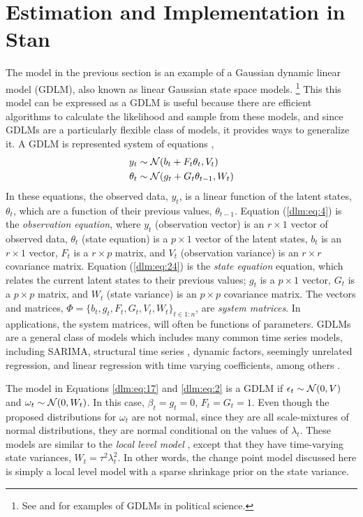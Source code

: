 \documentclass[12pt]{article}
\begin{document}
\section{Estimation and Implementation in Stan}
\label{dlm:sec:estimation}

The model in the previous section is an example of a Gaussian dynamic linear model (GDLM), also known as linear Gaussian state space models.%
\footnote{See \textcite{Beck1989} and \textcite{MartinQuinn2002} for examples of GDLMs in political science.}
This this model can be expressed as a GDLM is useful because there are efficient algorithms to calculate the likelihood and sample from these models, and since GDLMs are a particularly flexible class of models, it provides ways to generalize it.
A GDLM is represented system of equations \parencites{DurbinKoopman2012}{WestHarrison1997}{PetrisPetroneEtAl2009}[Ch 6]{ShumwayStoffer2010},
\begin{align}
  \label{dlm:eq:4}
  y_{t} &\sim \mathcal{N}\mathopen{}\left(b_{t} + F_{t} \theta_{t}, V_{t}\right)\mathclose{} \\
  \label{dlm:eq:24}
  \theta_{t} &\sim \mathcal{N}\mathopen{}\left(g_{t} + G_{t} \theta_{t - 1}, W_{t}\right)\mathclose{}
\end{align}
In these equations, the observed data, $y_{t}$, is a linear function of the latent states, $\theta_{t}$, which are a function of their previous values, $\theta_{t-1}$.
Equation (\ref{dlm:eq:4}) is the \textit{observation equation}, where $y_{t}$ (observation vector) is an $r \times 1$ vector of observed data, $\theta_{t}$ (state equation) is a $p \times 1$ vector of the latent states, $b_{t}$ is an $r \times 1$ vector, $F_{t}$ is a $r \times p$ matrix, and $V_{t}$ (observation variance) is an $r \times r$ covariance matrix.
Equation (\ref{dlm:eq:24}) is the \textit{state equation} equation, which relates the current latent states to their previous values; $g_{t}$ is a $p \times 1$ vector, $G_{t}$ is a $p \times p$ matrix, and $W_{t}$ (state variance) is an $p \times p$ covariance matrix.
The vectors and matrices, $\Phi = \{ b_{t}, g_{t}, F_{t}, G_{t}, V_{t}, W_{t} \}_{t \in 1:n}$, are \textit{system matrices}.
In applications, the system matrices, will often be functions of parameters.
GDLMs are a general class of models which includes many common time series models, including SARIMA, structural time series \parencite{Harvey1990}, dynamic factors, seemingly unrelated regression, and linear regression with time varying coefficients, among others \parencite[Ch. 3]{DurbinKoopman2012}.

The model in Equations \eqref{dlm:eq:17} and \eqref{dlm:eq:2} is a GDLM if $\epsilon_{t} \sim \mathcal{N}\mathopen{}\left(0, V\right)\mathclose{}$ and $\omega_{t} \sim \mathcal{N}\mathopen{}\left(0, W_{t}\right)\mathclose{}$.
In this case, $\beta_{t} = g_{t} = 0$, $F_{t} = G_{t} = 1$.
Even though the proposed distributions for $\omega_{t}$ are not normal, since they are all scale-mixtures of normal distributions, they are normal conditional on the values of $\lambda_{t}$.%
These models are similar to the \textit{local level model} \parencite[Ch 2.]{DurbinKoopman2012}, except that they have time-varying state variances, $W_{t} = \tau^2 \lambda^2_t$.
In other words, the change point model discussed here is simply a local level model with a sparse shrinkage prior on the state variance.
\end{document}
